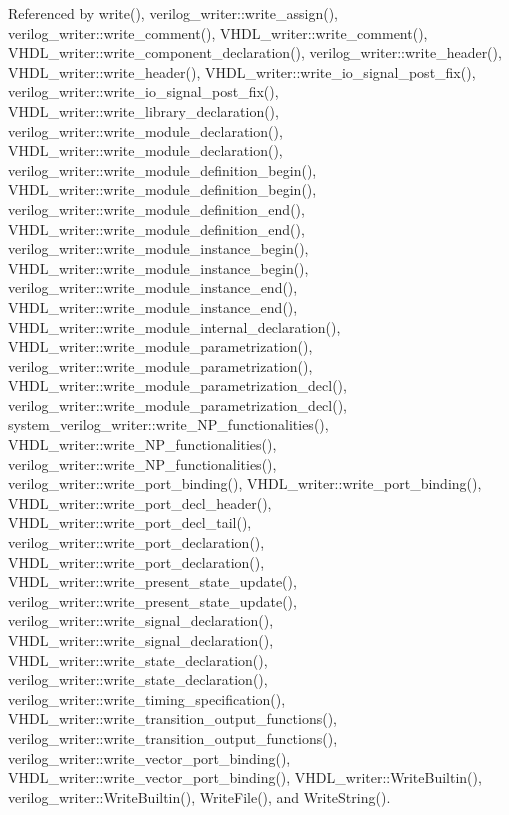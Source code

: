 Referenced by write(), verilog\+\_\+writer\+::write\+\_\+assign(), verilog\+\_\+writer\+::write\+\_\+comment(), V\+H\+D\+L\+\_\+writer\+::write\+\_\+comment(), V\+H\+D\+L\+\_\+writer\+::write\+\_\+component\+\_\+declaration(), verilog\+\_\+writer\+::write\+\_\+header(), V\+H\+D\+L\+\_\+writer\+::write\+\_\+header(), V\+H\+D\+L\+\_\+writer\+::write\+\_\+io\+\_\+signal\+\_\+post\+\_\+fix(), verilog\+\_\+writer\+::write\+\_\+io\+\_\+signal\+\_\+post\+\_\+fix(), V\+H\+D\+L\+\_\+writer\+::write\+\_\+library\+\_\+declaration(), verilog\+\_\+writer\+::write\+\_\+module\+\_\+declaration(), V\+H\+D\+L\+\_\+writer\+::write\+\_\+module\+\_\+declaration(), verilog\+\_\+writer\+::write\+\_\+module\+\_\+definition\+\_\+begin(), V\+H\+D\+L\+\_\+writer\+::write\+\_\+module\+\_\+definition\+\_\+begin(), verilog\+\_\+writer\+::write\+\_\+module\+\_\+definition\+\_\+end(), V\+H\+D\+L\+\_\+writer\+::write\+\_\+module\+\_\+definition\+\_\+end(), verilog\+\_\+writer\+::write\+\_\+module\+\_\+instance\+\_\+begin(), V\+H\+D\+L\+\_\+writer\+::write\+\_\+module\+\_\+instance\+\_\+begin(), verilog\+\_\+writer\+::write\+\_\+module\+\_\+instance\+\_\+end(), V\+H\+D\+L\+\_\+writer\+::write\+\_\+module\+\_\+instance\+\_\+end(), V\+H\+D\+L\+\_\+writer\+::write\+\_\+module\+\_\+internal\+\_\+declaration(), V\+H\+D\+L\+\_\+writer\+::write\+\_\+module\+\_\+parametrization(), verilog\+\_\+writer\+::write\+\_\+module\+\_\+parametrization(), V\+H\+D\+L\+\_\+writer\+::write\+\_\+module\+\_\+parametrization\+\_\+decl(), verilog\+\_\+writer\+::write\+\_\+module\+\_\+parametrization\+\_\+decl(), system\+\_\+verilog\+\_\+writer\+::write\+\_\+\+N\+P\+\_\+functionalities(), V\+H\+D\+L\+\_\+writer\+::write\+\_\+\+N\+P\+\_\+functionalities(), verilog\+\_\+writer\+::write\+\_\+\+N\+P\+\_\+functionalities(), verilog\+\_\+writer\+::write\+\_\+port\+\_\+binding(), V\+H\+D\+L\+\_\+writer\+::write\+\_\+port\+\_\+binding(), V\+H\+D\+L\+\_\+writer\+::write\+\_\+port\+\_\+decl\+\_\+header(), V\+H\+D\+L\+\_\+writer\+::write\+\_\+port\+\_\+decl\+\_\+tail(), verilog\+\_\+writer\+::write\+\_\+port\+\_\+declaration(), V\+H\+D\+L\+\_\+writer\+::write\+\_\+port\+\_\+declaration(), V\+H\+D\+L\+\_\+writer\+::write\+\_\+present\+\_\+state\+\_\+update(), verilog\+\_\+writer\+::write\+\_\+present\+\_\+state\+\_\+update(), verilog\+\_\+writer\+::write\+\_\+signal\+\_\+declaration(), V\+H\+D\+L\+\_\+writer\+::write\+\_\+signal\+\_\+declaration(), V\+H\+D\+L\+\_\+writer\+::write\+\_\+state\+\_\+declaration(), verilog\+\_\+writer\+::write\+\_\+state\+\_\+declaration(), verilog\+\_\+writer\+::write\+\_\+timing\+\_\+specification(), V\+H\+D\+L\+\_\+writer\+::write\+\_\+transition\+\_\+output\+\_\+functions(), verilog\+\_\+writer\+::write\+\_\+transition\+\_\+output\+\_\+functions(), verilog\+\_\+writer\+::write\+\_\+vector\+\_\+port\+\_\+binding(), V\+H\+D\+L\+\_\+writer\+::write\+\_\+vector\+\_\+port\+\_\+binding(), V\+H\+D\+L\+\_\+writer\+::\+Write\+Builtin(), verilog\+\_\+writer\+::\+Write\+Builtin(), Write\+File(), and Write\+String().

